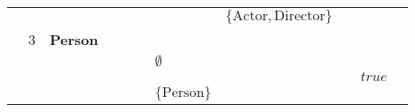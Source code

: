 \begin{table}[]
{\begin{tabular}{lllllllllll}
                          &                           &                   &                                                                          &                                                                        &                           &                                                             & \cellcolor[HTML]{FC8D59}$\{\text{Actor}, \text{Director}\}$                &                                                                           &                                 &                                                                        \\
                          & \cellcolor[HTML]{FC8D59}3 & \textbf{Person}   &                                                                          &                                                                        &                           &                                                             &                                                                            &                                                                           &                                 &                                                                        \\
                          &                           &                   &                                                                          &                                                                        &                           & \cellcolor[HTML]{FC8D59}$\emptyset$                         &                                                                            &                                                                           &                                 &                                                                        \\
                          &                           &                   &                                                                          &                                                                        &                           &                                                             &                                                                            &                                                                           & \cellcolor[HTML]{FC8D59}$true$  &                                                                        \\
                          &                           &                   &                                                                          &                                                                        &                           & \cellcolor[HTML]{FC8D59}$\{\text{Person}\}$                 &                                                                            &                                                                           &                                 &                                                                        \\

\end{tabular}}
\end{table}
